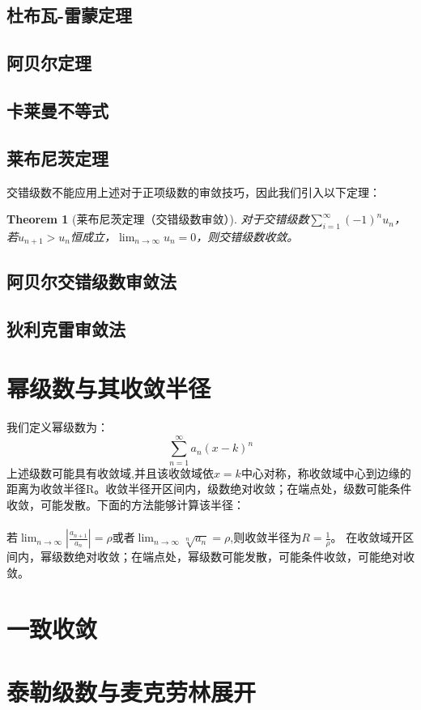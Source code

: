 \documentclass[12pt,a4paper,UTF8]{ctexbook}
\theoremstyle{plain}
\newtheorem{theorem}{\indent Theorem}[section]
\begin{document}
\subsection{杜布瓦-雷蒙定理}
\subsection{阿贝尔定理}
\subsection{卡莱曼不等式}
\subsection{莱布尼茨定理}
交错级数不能应用上述对于正项级数的审敛技巧，因此我们引入以下定理：
\begin{theorem}[莱布尼茨定理（交错级数审敛）]
对于交错级数$\sum_{i=1}^\infty (-1)^nu_n$，若$u_{n+1}>u_n$恒成立，$\lim_{n\to\infty}u_n=0$，则交错级数收敛。
\end{theorem}
\subsection{阿贝尔交错级数审敛法}
\subsection{狄利克雷审敛法}
\section{幂级数与其收敛半径}
我们定义幂级数为：
\begin{equation}
    \sum_{n=1}^\infty a_n(x-k)^n
\end{equation}
上述级数可能具有收敛域,并且该收敛域依$x=k$中心对称，称收敛域中心到边缘的距离为收敛半径R。收敛半径开区间内，级数绝对收敛；在端点处，级数可能条件收敛，可能发散。下面的方法能够计算该半径：
\paragraph{}若$\lim_{n\to \infty}|\frac{a_{n+1}}{a_n}|=\rho$或者$\lim_{n\to \infty}\sqrt[n]{a_n}=\rho$,则收敛半径为$R=\frac{1}{\rho}$。
在收敛域开区间内，幂级数绝对收敛；在端点处，幂级数可能发散，可能条件收敛，可能绝对收敛。
\section{一致收敛}
\section{泰勒级数与麦克劳林展开}
\end{document}
